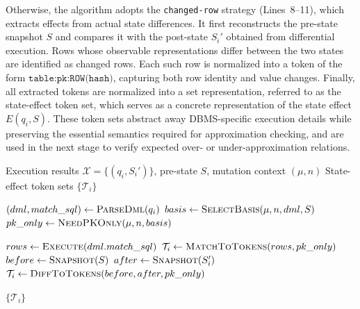 Otherwise, the algorithm adopts the \texttt{changed-row} strategy (Lines~8--11), which extracts effects from actual state differences.
It first reconstructs the pre-state snapshot $S$ and compares it with the post-state $S_i'$ obtained from differential execution.
Rows whose observable representations differ between the two states are identified as changed rows.
Each such row is normalized into a token of the form $\texttt{table:pk:ROW(hash)}$, capturing both row identity and value changes.
Finally, all extracted tokens are normalized into a set representation, referred to as the state-effect token set, which serves as a concrete representation of the state effect \(E(q_i,S)\).
These token sets abstract away DBMS-specific execution details while preserving the essential semantics required for approximation checking, and are used in the next stage to verify expected over- or under-approximation relations.


\begin{algorithm}[t]
	\caption{State-Effect Extraction}
	\footnotesize
	\label{alg:state_effect_extraction}
	\begin{algorithmic}[1]
		\Require Execution results $\mathcal{X} = \{(q_i, S_i')\}$, pre-state $S$, mutation context $(\mu, n)$
		\Ensure State-effect token sets $\{\mathcal{T}_i\}$
		
		\State $(dml, match\_sql) \gets \textsc{ParseDml}(q_i)$
		\State $basis \gets \textsc{SelectBasis}(\mu, n, dml, S)$
		\State $pk\_only \gets \textsc{NeedPKOnly}(\mu, n, basis)$
		
		\State $rows \gets \textsc{Execute}(dml.match\_sql)$
		\State $\mathcal{T}_i \gets \textsc{MatchToTokens}(rows, pk\_only)$
		\Else
		\State $before \gets \textsc{Snapshot}(S)$
		\State $after \gets \textsc{Snapshot}(S_i')$
		\State $\mathcal{T}_i \gets \textsc{DiffToTokens}(before, after, pk\_only)$
		\EndIf
		\EndFor
		
		\State \Return $\{\mathcal{T}_i\}$
	\end{algorithmic}
\end{algorithm}


